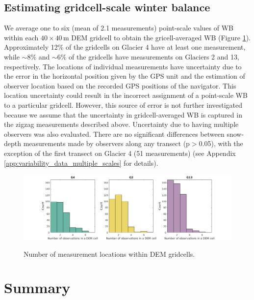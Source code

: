 \documentclass{sfuthesis}
\begin{document}
\subsection{Estimating gridcell-scale winter balance}

We average one to six (mean of 2.1 measurements) point-scale values of WB within each $40 \times 40$\,m DEM gridcell to obtain the gricell-averaged WB (Figure \ref{fig:NumObsPerCell}).
Approximately 12\% of the gridcells on Glacier 4 have at least one measurement, while $\sim$8\% and $\sim$6\% of the gridcells have measurements on Glaciers 2 and 13, respectively. The locations of individual measurements have uncertainty due to the error in the horizontal position given by the GPS unit and the estimation of observer location based on the recorded GPS positions of the navigator. This location uncertainty could result in the incorrect assignment of a point-scale WB to a particular gridcell. However, this source of error is not further investigated because we assume that the uncertainty in gridcell-averaged WB is captured in the zigzag measurements described above. Uncertainty due to having multiple observers was also evaluated. There are no significant differences between snow-depth measurements made by observers along any transect (p$>$0.05), with the exception of the first transect on Glacier 4 (51 measurements) (see Appendix \ref{app:variability_data_multiple_scales} for details). 

\begin{figure}[H]
	\centering
	\includegraphics[width =\textwidth]{NumObsPerCell.png}\\
	\caption{Number of measurement locations within DEM gridcells.}
	\label{fig:NumObsPerCell}
\end{figure}


\section{Summary}
\end{document}

